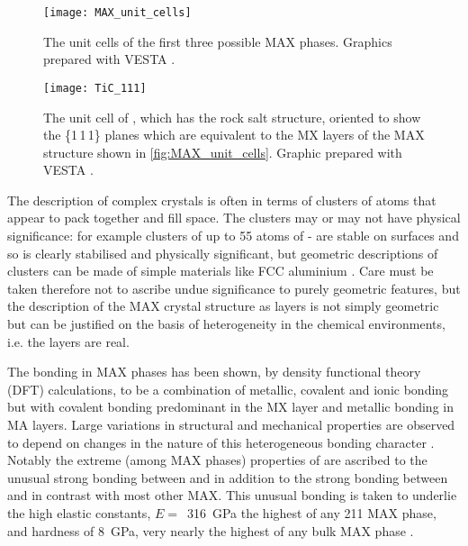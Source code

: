 \begin{figure}
\centering
\texttt{[image: MAX\_unit\_cells]}
\caption[The MAX phase unit cells.]{The unit cells of the first three possible MAX phases. Graphics prepared with VESTA \cite{Momma2011}.\label{fig:MAX_unit_cells}}
\end{figure}




\begin{figure}
\centering
{}
\texttt{[image: TiC\_111]}
\caption[The unit cell of .]{The unit cell of , which has the rock salt structure, oriented to show the \{1\,1\,1\} planes which are equivalent to the MX layers of the MAX structure shown in \autoref{fig:MAX_unit_cells}. Graphic prepared with VESTA \cite{Momma2011}.\label{fig:TiC_111}}
\end{figure}


The description of complex crystals is often in terms of clusters of atoms that appear to pack together and fill space. The clusters may or may not have physical significance: for example clusters of up to 55 atoms of - are stable on surfaces and so is clearly stabilised and physically significant, but geometric descriptions of clusters can be made of simple materials like FCC aluminium \cite{Steurer2006}. Care must be taken therefore not to ascribe undue significance to purely geometric features, but the description of the MAX crystal structure as layers is not simply geometric but can be justified on the basis of heterogeneity in the chemical environments, i.e. the layers are real.

The bonding in MAX phases has been shown, by density functional theory (DFT) calculations, to be a combination of metallic, covalent and ionic bonding but with covalent bonding predominant in the MX layer and metallic bonding in MA layers. Large variations in structural and mechanical properties are observed to depend on changes in the nature of this heterogeneous bonding character \cite{Radovic2013,Sun2011}. Notably the extreme (among MAX phases) properties of  are ascribed to the unusual strong bonding between  and  in addition to the strong bonding between  and  in contrast with most other MAX. This unusual bonding is taken to underlie the high elastic constants, $E =$~\SI{316}{\giga\pascal} the highest of any 211 MAX phase, and hardness of \SI{8}{\giga\pascal}, very nearly the highest of any bulk MAX phase \cite{Feng2010,Sun2011}.

